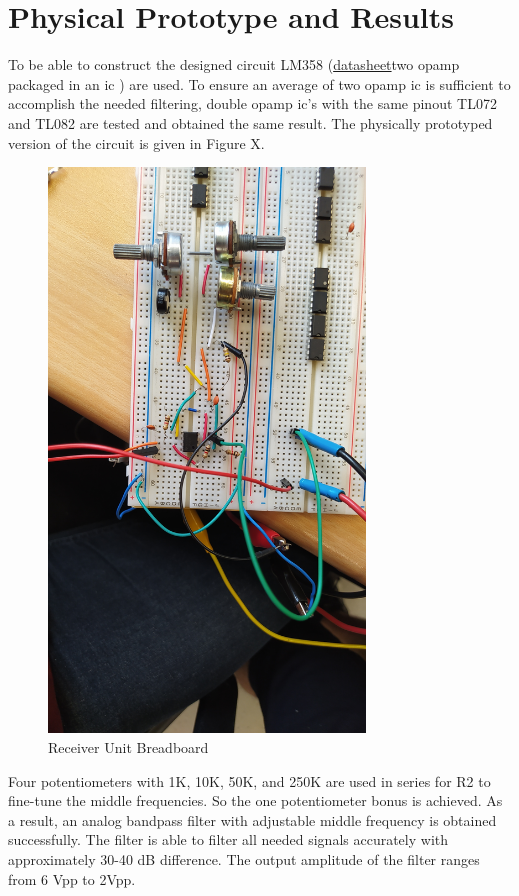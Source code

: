 \documentclass[letterpaper,12pt]{article}
\begin{document}
\section{Physical Prototype and Results}
To be able to construct the designed circuit LM358 (\href{https://pdf.direnc.net/upload/lm358-datasheet.pdf}{datasheet}two opamp packaged in an ic ) are used. To ensure an average of two opamp ic is sufficient to accomplish the needed filtering, double opamp ic's with the same pinout TL072 and TL082 are tested and obtained the same result. The physically prototyped version of the circuit is given in Figure X.
\begin{figure}[H]
    \centering
    \includegraphics[width = 0.75\textwidth]{receiver_bread.jpg}
    \caption{Receiver Unit Breadboard}
\end{figure}
Four potentiometers with 1K, 10K, 50K, and 250K are used in series for R2 to fine-tune the middle frequencies. So the one potentiometer bonus is achieved.
As a result, an analog bandpass filter with adjustable middle frequency is obtained successfully. The filter is able to filter all needed signals accurately with approximately 30-40 dB difference. The output amplitude of the filter ranges from 6 Vpp to 2Vpp. 
\end{document}
